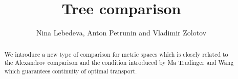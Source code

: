 \documentclass{article}
\begin{document}
\title{Tree comparison}
\author{Nina Lebedeva, Anton Petrunin and Vladimir Zolotov}


\newcommand{\Addresses}{{\bigskip\footnotesize
Anton Petrunin, \par\nopagebreak\textsc{Department of Mathematics, PSU, University Park, PA 16802, USA}
\par\nopagebreak
\textit{Email}: \texttt{petrunin@math.psu.edu}

\medskip
 
...
}}


\date{}

\maketitle

\begin{abstract}
We introduce a new type of comparison for metric spaces which is closely related to the Alexandrov comparison and the condition introduced by Ma Trudinger and Wang which guarantees continuity of optimal transport. 
\end{abstract}







\end{document}
